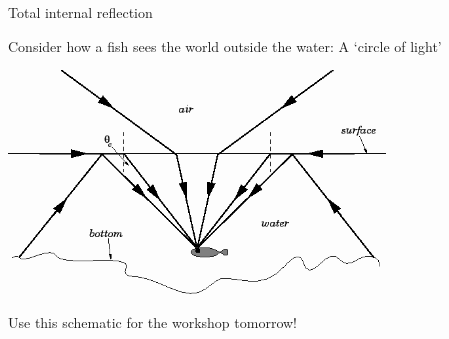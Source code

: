 %
%
%

\begin{frame}{Total internal reflection}

Consider how a fish sees the world outside the water: A `circle of light'

\begin{center}
    \includegraphics[width=0.75\textwidth]{./images/schematics/fish_view_circle_of_light}\\
\end{center}

Use this schematic for the workshop tomorrow!

\end{frame}

%
%
%

